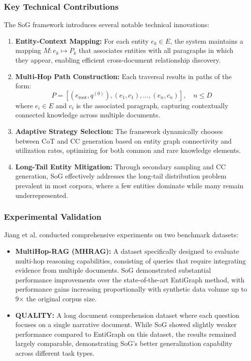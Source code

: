 \documentclass[11pt,a4paper]{article}
\begin{document}
\subsubsection{Key Technical Contributions}

The SoG framework introduces several notable technical innovations:

\begin{enumerate}
    \item \textbf{Entity-Context Mapping:} For each entity $e_k \in E$, the system maintains a mapping $M: e_k \mapsto P_k$ that associates entities with all paragraphs in which they appear, enabling efficient cross-document relationship discovery.
    
    \item \textbf{Multi-Hop Path Construction:} Each traversal results in paths of the form:
    \begin{equation}
    P = [(e_{\text{root}}, q^{(0)}), (e_1, c_1), \ldots, (e_n, c_n)], \quad n \leq D
    \end{equation}
    where $e_i \in E$ and $c_i$ is the associated paragraph, capturing contextually connected knowledge across multiple documents.
    
    \item \textbf{Adaptive Strategy Selection:} The framework dynamically chooses between CoT and CC generation based on entity graph connectivity and utilization rates, optimizing for both common and rare knowledge elements.
    
    \item \textbf{Long-Tail Entity Mitigation:} Through secondary sampling and CC generation, SoG effectively addresses the long-tail distribution problem prevalent in most corpora, where a few entities dominate while many remain underrepresented.
\end{enumerate}

\subsubsection{Experimental Validation}

Jiang et al. conducted comprehensive experiments on two benchmark datasets:

\begin{itemize}
    \item \textbf{MultiHop-RAG (MHRAG):} A dataset specifically designed to evaluate multi-hop reasoning capabilities, consisting of queries that require integrating evidence from multiple documents. SoG demonstrated substantial performance improvements over the state-of-the-art EntiGraph method, with performance gains increasing proportionally with synthetic data volume up to 9× the original corpus size.
    
    \item \textbf{QUALITY:} A long document comprehension dataset where each question focuses on a single narrative document. While SoG showed slightly weaker performance compared to EntiGraph on this dataset, the results remained largely comparable, demonstrating SoG's better generalization capability across different task types.
\end{itemize}
\end{document}
